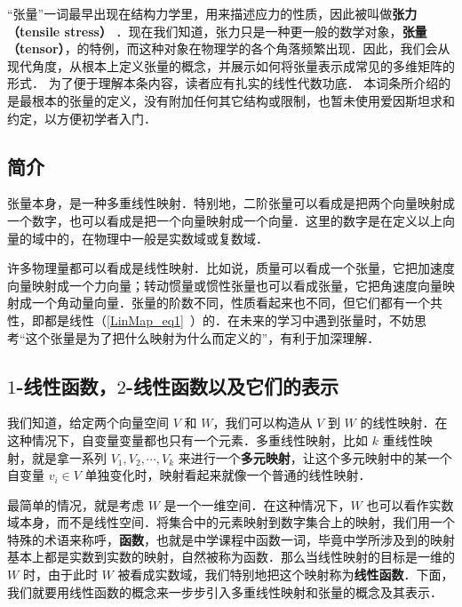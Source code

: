 


“张量”一词最早出现在结构力学里，用来描述应力的性质，因此被叫做\textbf{张力（tensile stress）}%
．现在我们知道，张力只是一种更一般的数学对象，\textbf{张量（tensor）}，的特例，而这种对象在物理学的各个角落频繁出现．因此，我们会从现代角度，从根本上定义张量的概念，并展示如何将张量表示成常见的多维矩阵的形式． 为了便于理解本条内容，读者应有扎实的线性代数功底． 本词条所介绍的是最根本的张量的定义，没有附加任何其它结构或限制，也暂未使用爱因斯坦求和约定，以方便初学者入门．

\subsection{简介}

张量本身，是一种多重线性映射．特别地，二阶张量可以看成是把两个向量映射成一个数字，也可以看成是把一个向量映射成一个向量．这里的数字是在定义以上向量的域中的，在物理中一般是实数域或复数域．

许多物理量都可以看成是线性映射．比如说，质量可以看成一个张量，它把加速度向量映射成一个力向量；转动惯量或惯性张量也可以看成张量，它把角速度向量映射成一个角动量向量．张量的阶数不同，性质看起来也不同，但它们都有一个共性，即都是线性（\autoref{LinMap_eq1}~）的．在未来的学习中遇到张量时，不妨思考“这个张量是为了把什么映射为什么而定义的”，有利于加深理解．

\subsection{$1$-线性函数，$2$-线性函数以及它们的表示}

我们知道，给定两个向量空间 $V$ 和 $W$，我们可以构造从 $V$ 到 $W$ 的线性映射．在这种情况下，自变量变量都也只有一个元素．多重线性映射，比如 $k$ 重线性映射，就是拿一系列 $V_1, V_2, \cdots, V_k$ 来进行一个\textbf{多元映射}，让这个多元映射中的某一个自变量 ${v}_i\in V$ 单独变化时，映射看起来就像一个普通的线性映射．

最简单的情况，就是考虑 $W$ 是一个一维空间．在这种情况下，$W$ 也可以看作实数域本身，而不是线性空间．将集合中的元素映射到数字集合上的映射，我们用一个特殊的术语来称呼，\textbf{函数}，也就是中学课程中函数一词，毕竟中学所涉及到的映射基本上都是实数到实数的映射，自然被称为函数．那么当线性映射的目标是一维的 $W$ 时，由于此时 $W$ 被看成实数域，我们特别地把这个映射称为\textbf{线性函数}．下面，我们就要用线性函数的概念来一步步引入多重线性映射和张量的概念及其表示．

